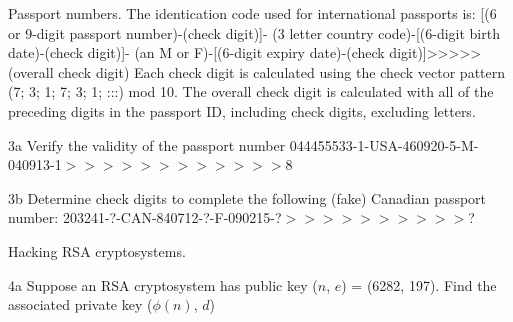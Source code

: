 
\begin{question}{3}
Passport numbers. The identication code used for international passports is:
[(6 or 9-digit passport number)-(check digit)]-
(3 letter country code)-[(6-digit birth date)-(check digit)]-
(an M or F)-[(6-digit expiry date)-(check digit)]>>>>>(overall check digit)
Each check digit is calculated using the check vector pattern (7; 3; 1; 7; 3; 1; :::) mod 10.
The overall check digit is calculated with all of the preceding digits in the passport ID,
including check digits, excluding letters.
\end{question}


\begin{question}{3a}
Verify the validity of the passport number
044455533-1-USA-460920-5-M-040913-1$>>>>>>>>>>>>$8
\end{question}


\begin{question}{3b}
Determine check digits to complete the following (fake) Canadian passport number:
203241-?-CAN-840712-?-F-090215-?$>>>>>>>>>>$?
\end{question}


\begin{question}{4}
Hacking RSA cryptosystems.
\end{question}


\begin{question}{4a}
Suppose an RSA cryptosystem has public key ($n$, $e$) = (6282, 197). Find the associated private key ($\phi(n)$, $d$)
\end{question}


